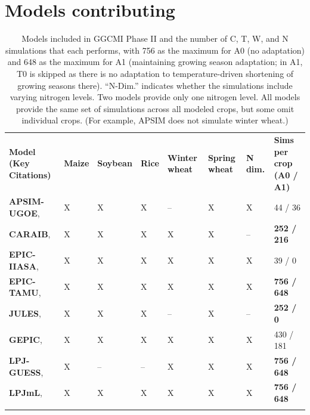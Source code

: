 \documentclass[gmd, manuscript]{copernicus} %
\begin{document}
\section{Models contributing}
\label{S:3}
\begin{table}[t]
\caption{Models included in GGCMI Phase II and the number of C, T, W, and N simulations that each performs, with 756 as the maximum for A0 (no adaptation) and 648 as the maximum for A1 (maintaining growing season adaptation; in A1, T0 is skipped as there is no adaptation to temperature-driven shortening of growing seasons there). 
``N-Dim.'' indicates whether the simulations include varying nitrogen levels. Two models provide only one nitrogen level. 
All models provide the same set of simulations across all modeled crops, but some omit individual crops. (For example, APSIM does not simulate winter wheat.)}
\label{table:models}
  \begin{tabular}{p{6cm} p{1cm} p{1cm} p{1cm} p{1cm} p{1cm} p{1cm} p{1.9cm}}
        \tophline
    {\textbf{Model (Key Citations)}}&{\textbf{Maize}}&{\textbf{Soybean}}&{\textbf{Rice}}&{\textbf{Winter wheat}}&{\textbf{Spring wheat}}&{\textbf{N dim.}}&{\textbf{Sims per crop (A0 / A1)}}\\ \middlehline
        {\textbf{APSIM-UGOE},   \citet{KEATING2003267, HOLZWORTH2014327}} & {X} & {X} & {X} & {--} & {X} & {X} & {44 / 36}\\ \middlehline
        {\textbf{CARAIB},       \citet{Dury2011, Pirttioja2015}} & {X} & {X} & {X} & {X} & {X} & {--} & {\textbf{252 / 216}}\\ \middlehline
        {\textbf{EPIC-IIASA},   \citet{BALKOVIC2014}} & {X} & {X} & {X} & {X} & {X} & {X} & {39 / 0}\\  \middlehline
        {\textbf{EPIC-TAMU},    \citet{Izaurralde06}} & {X} & {X} & {X} & {X} & {X} & {X} & {\textbf{756 / 648}}\\ \middlehline
        {\textbf{JULES},        \citet{Osborne2015, Williams2015, Williams2017}} & {X} & {X} & {X} & {--} & {X} & {--} & {\textbf{252 / 0}}\\ \middlehline
        {\textbf{GEPIC},        \citet{LIU2007478, FOLBERTH201221}} & {X} & {X} & {X} & {X} & {X} & {X} & {430 / 181}\\ \middlehline
        {\textbf{LPJ-GUESS},    \citet{Lindeskog2013, Olin2015}} & {X} & {--} & {--} & {X} & {X} & {X} & {\textbf{756 / 648}}\\  \middlehline
        {\textbf{LPJmL},        \citet{von_Bloh_implementing_2018}} & {X} & {X} & {X} & {X} & {X} & {X} & {\textbf{756 / 648}}\\ \middlehline

\end{tabular}
\end{table}
\end{document}
